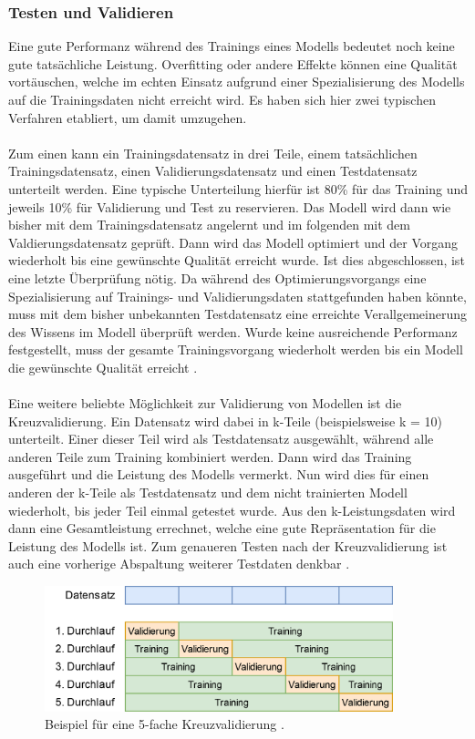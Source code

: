 \documentclass[11pt,bibliography=totocnumbered]{scrartcl}
\begin{document}
\subsubsection{Testen und Validieren}
Eine gute Performanz während des Trainings eines Modells bedeutet noch keine gute tatsächliche Leistung. Overfitting oder andere Effekte können eine Qualität vortäuschen, welche im echten Einsatz aufgrund einer Spezialisierung des Modells auf die Trainingsdaten nicht erreicht wird. Es haben sich hier zwei typischen Verfahren etabliert, um damit umzugehen. 
\\\\
Zum einen kann ein Trainingsdatensatz in drei Teile, einem tatsächlichen Trainingsdatensatz, einen Validierungsdatensatz und einen Testdatensatz unterteilt werden. Eine typische Unterteilung hierfür ist 80\% für das Training und jeweils 10\% für Validierung und Test zu reservieren. Das Modell wird dann wie bisher mit dem Trainingsdatensatz angelernt und im folgenden mit dem Valdierungsdatensatz geprüft. Dann wird das Modell optimiert und der Vorgang wiederholt bis eine gewünschte Qualität erreicht wurde. Ist dies  abgeschlossen, ist eine letzte Überprüfung nötig. Da während des Optimierungsvorgangs eine Spezialisierung auf Trainings- und Validierungsdaten stattgefunden haben könnte, muss mit dem bisher unbekannten Testdatensatz eine erreichte Verallgemeinerung des Wissens im Modell überprüft werden. Wurde keine ausreichende Performanz festgestellt, muss der gesamte Trainingsvorgang wiederholt werden bis ein Modell die gewünschte Qualität erreicht \cite[S.30-31]{MACHINE_LEARNING}\cite[S.43-44]{BA}.
\\\\
Eine weitere beliebte Möglichkeit zur Validierung von Modellen ist die Kreuzvalidierung. Ein Datensatz wird dabei in k-Teile (beispielsweise k = 10) unterteilt. Einer dieser Teil wird als Testdatensatz ausgewählt, während alle anderen Teile zum Training kombiniert werden. Dann wird das Training ausgeführt und die Leistung des Modells vermerkt. Nun wird dies für einen anderen der k-Teile als Testdatensatz und dem nicht trainierten Modell wiederholt, bis jeder Teil einmal getestet wurde. Aus den k-Leistungsdaten wird dann eine Gesamtleistung errechnet, welche eine gute Repräsentation für die Leistung des Modells ist. Zum genaueren Testen nach der Kreuzvalidierung ist auch eine vorherige Abspaltung weiterer Testdaten denkbar \cite[S.22]{DEEP_LEARNING}\cite[S.44]{BA}.
\begin{figure}[H]
	\centering
	\includegraphics[width=0.90\textwidth]{kreuzvalidierung}
	\vspace*{-3mm}
	\caption[Beispiel für Kreuzvalidierung]{Beispiel für eine 5-fache Kreuzvalidierung \cite[S.44]{BA}.}
	\label{fig:crossvalidation}
\end{figure}
\vspace*{-5mm}
\end{document}
